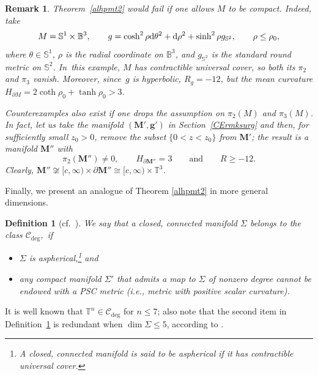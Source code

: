\documentclass[10pt,a4paper]{amsart}
\numberwithin{equation}{section}
\newtheorem{Definition}[Theorem]{Definition}
\newtheorem{Remark}[Theorem]{Remark} }
\def\B{\mathbb{B}}
\def\S{\mathbb{S}}
\def\T{\mathbb{T}}
\def\bs{\boldsymbol}
\def\Ccal{\mathcal{C}}
\def\ed{{\rm d}}
\begin{document}
\begin{Remark}
	Theorem~\ref{alhpmt2} would fail if one allows $M$ to be compact. Indeed,
	take
\[
M=\S^1\times\B^3, \qquad
g=\cosh^2\rho  \ed\theta^2 +\ed\rho^2 +\sinh^2\rho  g_{\S^2},\qquad \rho\leq \rho_0,
\]
where $\theta\in \S^1$, $\rho$ is the radial coordinate on $\B^3$, and $g_{\S^2}$ is the standard round metric on $\S^{2}$. In~this example, $M$ has contractible universal cover, so both
its $\pi_2$ and $\pi_3$ vanish. Moreover, since~$g$ is hyperbolic, $R_g = -12$,
but the mean curvature $H_{\partial M} = 2\coth\rho_0+\tanh\rho_0>3$.

Counterexamples also exist if one drops the assumption on $\pi_2(M)$ and $\pi_3(M)$. In fact, let us take the manifold
$(\bs{M}', \bs{g}')$ in Section~\ref{CErmksurg} and then, for sufficiently small $z_0>0$, remove the subset $\{0<z<z_0\}$ from $\bs{M}'$; the
result is a manifold $\bs{M}''$ with \[ \pi_2(\bs{M}'')\ne 0, \qquad H_{\partial\bs{M}''} = 3\qquad \mbox{and} \qquad R \ge -12.\]
Clearly, $\bs{M}''\not\cong [c,\infty)\times \partial{\bs{M}''} \cong [c,\infty)\times \T^3$.
\end{Remark}


Finally, we present an analogue of Theorem \ref{alhpmt2} in more general dimensions.
\begin{Definition}[{cf.~\cite{CLSZ2021}}]\label{cdegdef}
We say that a closed, connected manifold $\Sigma$ \emph{belongs to the class $\mathcal{C}_{\deg}$},~if
\begin{itemize}\itemsep=0pt
	\item $\Sigma$ is aspherical,\footnote{A closed, connected manifold is said to be \emph{aspherical} if
it has contractible universal cover.} and
	\item any compact manifold $\Sigma'$ that admits a map to $\Sigma$ of nonzero degree
			cannot be endowed with a PSC metric (i.e., metric with positive scalar curvature).
\end{itemize}
\end{Definition}
It is well known that $\T^n\in \Ccal_{\deg}$ for $n\le 7$; also note that the second item
in Definition~\ref{cdegdef} is redundant when $\dim \Sigma \le 5$,
according to \cite{CLL2021}.
\end{document}
